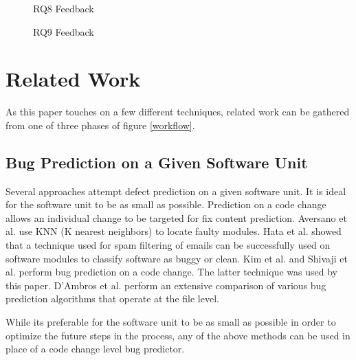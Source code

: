 \documentclass[conference]{IEEEtran}
\begin{document}
\begin{figure}
	\caption{RQ8 Feedback}
	\label{Suggester_RQ1_Results}
\end{figure}

\begin{figure}
	\caption{RQ9 Feedback}
	\label{Suggester_RQ2_Results}
\end{figure}

\section{Related Work}
\label{RelatedWork}

\par As this paper touches on a few different techniques, related work can be gathered from one of three phases of figure \ref{workflow}. 


\subsection{Bug Prediction on a Given Software Unit} 
\par Several approaches attempt defect prediction on a given software unit. It is ideal for the software unit to be as small as possible. Prediction on a code change allows an individual change to be targeted for fix content prediction. Aversano et al. \cite{aversano2007lbi} use KNN (K nearest neighbors) to locate faulty modules.  Hata et al. \cite{Hata2008} showed that a technique used for spam filtering of emails can be successfully used on software modules to classify software as buggy or clean. Kim et al. \cite{Kim2007p58} and Shivaji et al. \cite{shivaji2009reducing} perform bug prediction on a code change. The latter technique was used by this paper. D'Ambros et al. \cite{d2011evaluating} perform an extensive comparison of various bug prediction algorithms that operate at the file level.

\par While its preferable for the software unit to be as small as possible in order to optimize the future steps in the process, any of the above methods can be used in place of a code change level bug predictor.
\end{document}
